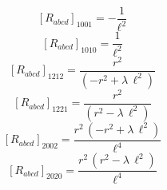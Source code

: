 \documentclass[11pt]{article}
\begin{document}
\begin{dmath*}[breakdepth={5}]
\left[R_{abcd}\right]_{1001} = -\frac{1}{{\ell}^{2}}
\end{dmath*}
\begin{dmath*}[breakdepth={5}]
\left[R_{abcd}\right]_{1010} = \frac{1}{{\ell}^{2}}
\end{dmath*}
\begin{dmath*}[breakdepth={5}]
\left[R_{abcd}\right]_{1212} = \frac{{r}^{2}}{\left(-{r}^{2} + \lambda\,{\ell}^{2}\right)}
\end{dmath*}
\begin{dmath*}[breakdepth={5}]
\left[R_{abcd}\right]_{1221} = \frac{{r}^{2}}{\left({r}^{2} - \lambda\,{\ell}^{2}\right)}
\end{dmath*}
\begin{dmath*}[breakdepth={5}]
\left[R_{abcd}\right]_{2002} = \frac{{r}^{2}\,\left(-{r}^{2} + \lambda\,{\ell}^{2}\right)}{{\ell}^{4}}
\end{dmath*}
\begin{dmath*}[breakdepth={5}]
\left[R_{abcd}\right]_{2020} = \frac{{r}^{2}\,\left({r}^{2} - \lambda\,{\ell}^{2}\right)}{{\ell}^{4}}
\end{dmath*}
\end{document}
